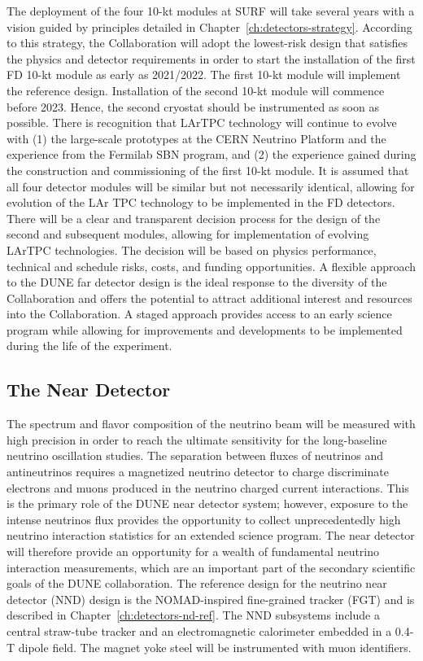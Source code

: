 The deployment of the four 10-kt modules at SURF will take several
years with a vision guided by principles detailed in
Chapter~\ref{ch:detectors-strategy}. According to this strategy, the
Collaboration will adopt the lowest-risk design that satisfies the
physics and detector requirements in order to start the
installation of the first FD 10-kt module as early as 2021/2022.
 The first 10-kt module
will implement the reference design. %
Installation of the second 10-kt module will commence
before 2023.  Hence, the second cryostat should be
instrumented as soon as possible.  There is recognition that
LArTPC technology will continue to evolve with (1) the large-scale
prototypes at the CERN Neutrino Platform and the experience from the
Fermilab SBN program, and (2) the experience gained during the
construction and commissioning of the first 10-kt module.  It is
assumed that all four detector modules will be similar but not
necessarily identical, allowing for evolution of the LAr TPC
technology to be implemented in the FD detectors. There will be a
clear and transparent decision process for the design of the second
and subsequent modules, allowing for implementation of evolving LArTPC
technologies. The decision will be based on physics performance,
technical and schedule risks, costs, and funding opportunities.  A
flexible approach to the DUNE far detector design is the ideal
response to the diversity of the Collaboration and offers the
potential to attract additional interest and resources into the
Collaboration. A staged approach provides access to an early science
program while allowing for improvements and developments to be
implemented during the life of the experiment.

\subsection{The Near Detector}
\label{sec:intro-dune-near-det}

The spectrum and flavor composition of the neutrino beam will be
measured with high precision in order to reach the ultimate
sensitivity for the long-baseline neutrino oscillation studies.  The
separation between fluxes of neutrinos and antineutrinos requires a
magnetized neutrino detector to charge discriminate electrons and
muons produced in the neutrino charged current interactions.  This is
the primary role of the DUNE near detector system; however, exposure
to the intense neutrinos flux provides the opportunity to collect
unprecedentedly high neutrino interaction statistics for an extended
science program.  The near detector will therefore provide an
opportunity for a wealth of fundamental neutrino interaction
measurements, which are an important part of the secondary scientific
goals of the DUNE collaboration.  The reference design for the
neutrino near detector (NND) design is the NOMAD-inspired fine-grained
tracker (FGT) and is described in
Chapter~\ref{ch:detectors-nd-ref}. The NND subsystems include a
central straw-tube tracker and an electromagnetic calorimeter embedded
in a 0.4-T dipole field. The magnet yoke steel will be instrumented
with muon identifiers.

